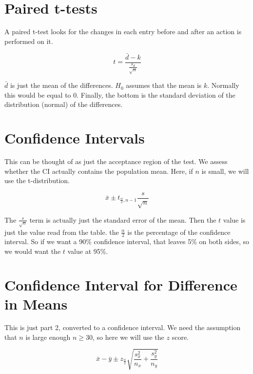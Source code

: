 \documentclass{article}
\theoremstyle{mytheoremstyle}
\theoremstyle{mytheoremstyle}
\theoremstyle{myproblemstyle}
\begin{document}
    \section{Paired t-tests}
    A paired t-test looks for the changes in each entry before and after an action is performed on it.
    
    \begin{definition}
        $$t = \frac{\bar{d} - k}{\frac{s_d}{\sqrt{n}}}$$
    \end{definition}

    $\bar{d}$ is just the mean of the differences. $H_0$ assumes that the mean is $k$. Normally this would be equal to 0. Finally, the bottom is the standard deviation of the distribution (normal) of the differences. 

    \section{Confidence Intervals}
    

    This can be thought of as just the acceptance region of the test. We assess whether the CI actually contains the population mean. Here, if $n$ is small, we will use the t-distribution.

    \begin{definition}

        \[\bar{x} \pm t_{\frac{\alpha}{2}, n-1} \frac{s}{\sqrt{n}}\]
        
    \end{definition}

    The $\frac{s}{\sqrt{n}}$ term is actually just the standard error of the mean. Then the $t$ value is just the value read from the table. the $\frac{\alpha}{2}$ is the percentage of the confidence interval. So if we want a 90\% confidence interval, that leaves 5\% on both sides, so we would want the $t$ value at 95\%.

    \section{Confidence Interval for Difference in Means}

    This is just part 2, converted to a confidence interval. We need the assumption that $n$ is large enough $n \geq 30$, so here we will use the $z$ score. 

    \begin{definition}

        \[\bar{x} - \bar{y} \pm z_{\frac{\alpha}{2}} \sqrt{\frac{s_x^2}{n_x} + \frac{s_y^2}{n_y}}\]
        
    \end{definition}
\end{document}
